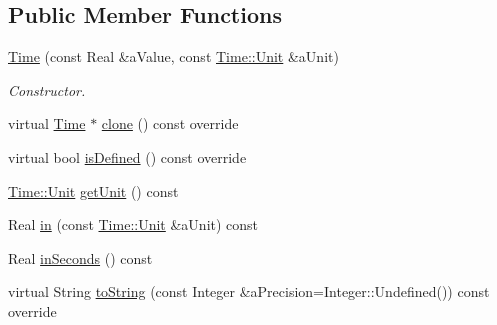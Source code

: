 \subsection*{Public Member Functions}
\begin{DoxyCompactItemize}
\item 
\hyperlink{classostk_1_1physics_1_1units_1_1_time_a731e1f09af9f9e95cac914cc189cbbad}{Time} (const Real \&a\+Value, const \hyperlink{classostk_1_1physics_1_1units_1_1_time_aa961f0dbca7ec297e19e15e0dfa3bb4a}{Time\+::\+Unit} \&a\+Unit)
\begin{DoxyCompactList}\small\item\em Constructor. \end{DoxyCompactList}\item 
virtual \hyperlink{classostk_1_1physics_1_1units_1_1_time}{Time} $\ast$ \hyperlink{classostk_1_1physics_1_1units_1_1_time_ae714d9f44d7ab651de5f37c5085f38fa}{clone} () const override
\item 
virtual bool \hyperlink{classostk_1_1physics_1_1units_1_1_time_a1b89925067e81636fa80f6e73eed3625}{is\+Defined} () const override
\item 
\hyperlink{classostk_1_1physics_1_1units_1_1_time_aa961f0dbca7ec297e19e15e0dfa3bb4a}{Time\+::\+Unit} \hyperlink{classostk_1_1physics_1_1units_1_1_time_a2e6a342d3c8b7ee85764223855056fb0}{get\+Unit} () const
\item 
Real \hyperlink{classostk_1_1physics_1_1units_1_1_time_a222edb0c7de6cfbc5ae29632261bc829}{in} (const \hyperlink{classostk_1_1physics_1_1units_1_1_time_aa961f0dbca7ec297e19e15e0dfa3bb4a}{Time\+::\+Unit} \&a\+Unit) const
\item 
Real \hyperlink{classostk_1_1physics_1_1units_1_1_time_afbb52cb65acea3748fdd1952fc9d81ee}{in\+Seconds} () const
\item 
virtual String \hyperlink{classostk_1_1physics_1_1units_1_1_time_a6805d7d9b298d1ba9f219294e11a363c}{to\+String} (const Integer \&a\+Precision=Integer\+::\+Undefined()) const override
\end{DoxyCompactItemize}

